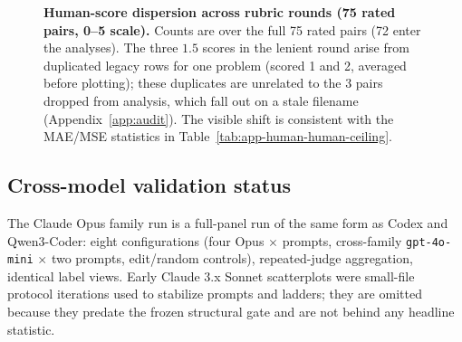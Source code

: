 \documentclass{article}
\begin{document}
\begin{figure}[t]
  \centering
  \caption{\textbf{Human-score dispersion across rubric rounds (75 rated pairs, 0--5 scale).}
    Counts are over the full 75 rated pairs (72 enter the analyses).
    The three $1.5$ scores in the lenient round arise from duplicated legacy rows for one problem (scored 1 and 2, averaged before plotting); these duplicates are unrelated to the 3 pairs dropped from analysis, which fall out on a stale filename (Appendix~\ref{app:audit}).
    The visible shift is consistent with the MAE/MSE statistics in Table~\ref{tab:app-human-human-ceiling}.}
  \label{fig:app-human-pass-hist}
\end{figure}

\subsection{Cross-model validation status}
The Claude Opus family run is a full-panel run of the same form as Codex and Qwen3-Coder: eight configurations (four Opus $\times$ prompts, cross-family \texttt{gpt-4o-mini} $\times$ two prompts, edit/random controls), repeated-judge aggregation, identical label views.
Early Claude 3.x Sonnet scatterplots were small-file protocol iterations used to stabilize prompts and ladders; they are omitted because they predate the frozen structural gate and are not behind any headline statistic.
\end{document}
